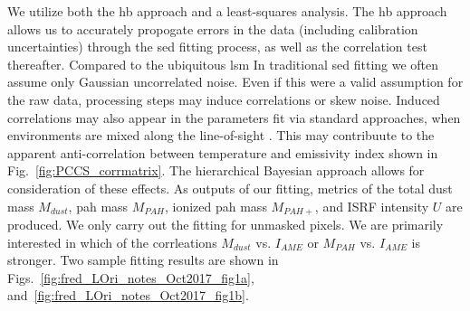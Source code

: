           We utilize both the \acrlong{hb} approach and a least-squares analysis. The \acrshort{hb} approach allows us to accurately propogate errors in the data (including calibration uncertainties) through the \acrshort{sed} fitting process, as well as the correlation test thereafter. Compared to the ubiquitous \acrlong{lsm} In traditional \acrshort{sed} fitting we often assume only Gaussian uncorrelated noise. Even if this were a valid assumption for the raw data, processing steps may induce correlations or skew noise. Induced correlations may also appear in the parameters fit via standard approaches, when environments are mixed along the line-of-sight \citep{shetty09}. This may contribuute to the apparent anti-correlation between temperature and emissivity index shown in Fig.~\ref{fig:PCCS_corrmatrix}. The hierarchical Bayesian approach allows for consideration of these effects. As outputs of our fitting, metrics of the total dust mass $M_{dust}$, \acrshort{pah} mass $M_{PAH}$, ionized \acrshort{pah} mass $M_{PAH+}$, and ISRF intensity $U$ are produced. We only carry out the fitting for unmasked pixels. We are primarily interested in which of the corrleations $M_{dust}$ vs. $I_{AME}$ or $M_{PAH}$ vs. $I_{AME}$ is stronger.
          Two sample fitting results are shown in Figs.~\ref{fig:fred_LOri_notes_Oct2017_fig1a}, and~\ref{fig:fred_LOri_notes_Oct2017_fig1b}.
